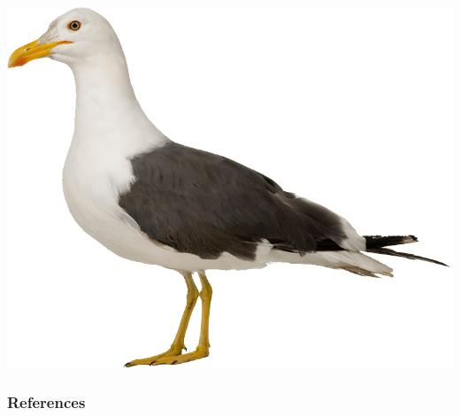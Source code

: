 \documentclass{technical_presentation}
\begin{document}
\begin{frame}[plain]
	\centering
	\includegraphics[height=\textheight]{figures/gull}
\end{frame}
  



\appendix

\begin{frame}[allowframebreaks]
	\frametitle{References}
	\printbibliography
\end{frame}
\end{document}
